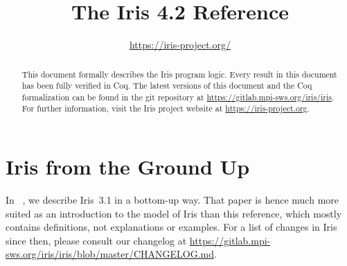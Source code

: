 \documentclass[10pt]{article}
\title{\bfseries The Iris 4.2 Reference}
\author{\url{https://iris-project.org/}}
\begin{document}
\maketitle
\thispagestyle{empty}
\vfill
\begin{abstract}
This document formally describes the Iris program logic.
Every result in this document has been fully verified in Coq.
The latest versions of this document and the Coq formalization can be found in the git repository at \url{https://gitlab.mpi-sws.org/iris/iris}.
For further information, visit the Iris project website at \url{https://iris-project.org}.
\end{abstract}

\clearpage\begingroup
\tableofcontents
\endgroup

\clearpage\begingroup
\section{Iris from the Ground Up}
In ~\cite{iris-ground-up}, we describe Iris~3.1 in a bottom-up way.
That paper is hence much more suited as an introduction to the model of Iris than this reference, which mostly contains definitions, not explanations or examples.
For a list of changes in Iris since then, please consult our changelog at \url{https://gitlab.mpi-sws.org/iris/iris/blob/master/CHANGELOG.md}.
\endgroup

\clearpage\begingroup

\endgroup
\clearpage\begingroup

\endgroup
\clearpage\begingroup

\endgroup
\clearpage\begingroup

\endgroup
\clearpage\begingroup

\endgroup
\clearpage\begingroup

\endgroup
\clearpage\begingroup

\endgroup
\clearpage\begingroup

\endgroup
\clearpage\begingroup

\endgroup
\clearpage\begingroup

\endgroup
\clearpage\begingroup
\printbibliography
\endgroup
\end{document}
